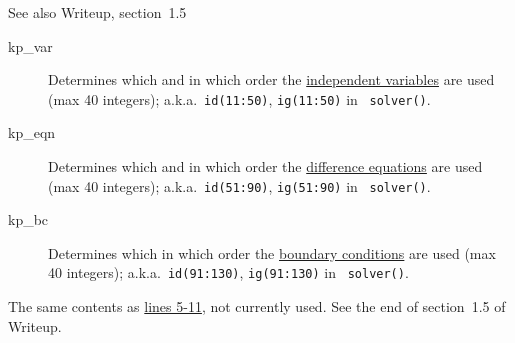 See also Writeup, section~1.5
\hypertarget{kd1}{}
\begin{description}
\item[kp\_var]\hypertarget{kp_var}{} Determines which and in which order the \hyperlink{indvars}{independent variables} are used (max 40 integers); a.k.a.\ \texttt{id(11:50)}, \texttt{ig(11:50)} in \eg\ \texttt{solver()}.
\item[kp\_eqn]\hypertarget{kp_eqn}{} Determines which and in which order the \hyperlink{difeqs}{difference equations} are used (max 40 integers); a.k.a.\ \texttt{id(51:90)}, \texttt{ig(51:90)} in \eg\ \texttt{solver()}.
\item[kp\_bc]\hypertarget{kp_bc}{} Determines which in which order the \hyperlink{boundcs}{boundary conditions} are used (max 40 integers); a.k.a.\ \texttt{id(91:130)}, \texttt{ig(91:130)} in \eg\ \texttt{solver()}.
\end{description}




\hypertarget{kd2}{}The same contents as \hyperlink{kd1}{lines 5-11}, not currently used. See the end of section~1.5 of Writeup.






